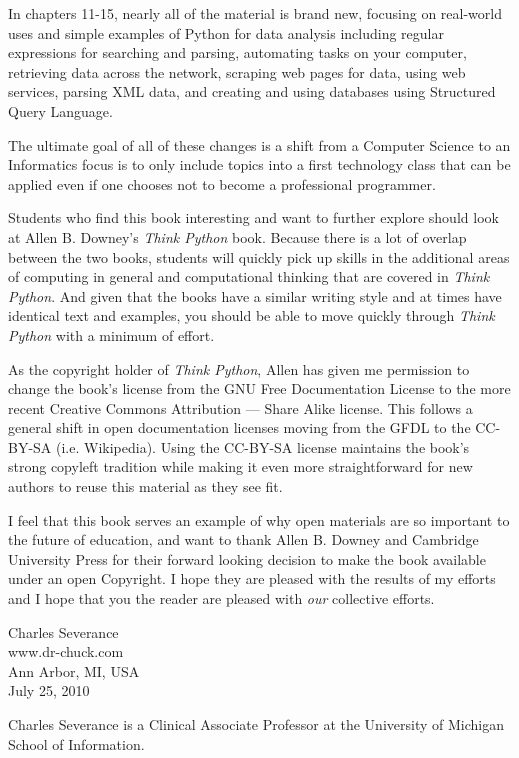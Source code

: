 \documentclass[10pt]{book}
\begin{document}
In chapters 11-15, nearly all of the material is brand new, focusing
on real-world uses and simple examples of Python for data analysis 
including regular expressions for searching and parsing, 
automating tasks on your computer, retrieving data across 
the network, scraping web pages for data, 
using web services, parsing XML data, and creating 
and using databases using Structured Query Language.

The ultimate goal of all of these changes is a shift from a 
Computer Science to an Informatics
focus is to only include topics into a first technology 
class that can be applied even if one chooses not to 
become a professional programmer.

Students who find this book interesting and want to further explore
should look at Allen B. Downey's \emph{Think Python} book.  Because there
is a lot of overlap between the two books,
students will quickly pick up skills in the additional
areas of computing in general and computational thinking 
that are covered in \emph{Think Python}.
And given that the books have a similar writing style and at times
have identical text and examples, you should be 
able to move quickly through \emph{Think Python} with a minimum of effort.

As the copyright holder of \emph{Think Python},
Allen has given me permission to change the book's license 
from the
GNU Free Documentation License 
to the more recent
Creative Commons Attribution --- Share Alike
license.
This follows a general shift in open documentation licenses moving 
from the GFDL to the CC-BY-SA (i.e. Wikipedia).
Using the CC-BY-SA license maintains the book's 
strong copyleft tradition while making it even more straightforward 
for new authors to reuse this material as they see fit.

I feel that this book serves an example of why open 
materials are so important to the future of education,
and want to thank Allen B. Downey and Cambridge University
Press for their forward looking decision to make the book available
under an open Copyright.   I hope they are pleased with the 
results of my efforts and I hope that you the reader are pleased with
\emph{our} collective efforts.

Charles Severance\\
www.dr-chuck.com\\
Ann Arbor, MI, USA\\
July 25, 2010

Charles Severance is a 
Clinical Associate Professor 
at the University of Michigan School of Information.
\end{document}
